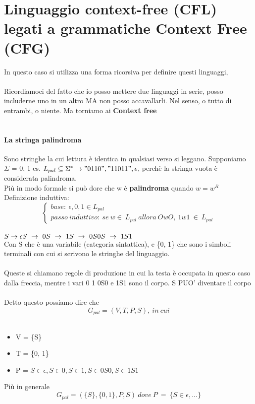 \documentclass[12pt, a4paper, openany, oneside]{book}
\begin{document}
\section{Linguaggio context-free (CFL) legati a grammatiche Context Free (CFG)}
In questo caso si utilizza una forma ricorsiva per definire questi linguaggi,
\\ \\
Ricordiamoci del fatto che io posso mettere due linguaggi in serie, posso 
includerne uno in un altro MA non posso accavallarli. Nel senso, o tutto di 
entrambi, o niente. Ma torniamo ai \textbf{Context free}
\\ \\
\paragraph{La stringa palindroma}
Sono stringhe la cui lettura è identica in qualsiasi verso si leggano. Supponiamo
$\Sigma$ = {0, 1} es. $L_{pal} \subseteq \Sigma ^{*} \to "0110", "11011", 
\epsilon$, perchè la stringa vuota è considerata palindroma. \\ 
Più in modo formale si può dore che w è \textbf{palindroma} quando $w = w^{R}$
Definizione induttiva:
\[
\begin{cases}
base:~\epsilon, 0, 1 \in L_{pal} \\
passo~induttivo:~ se ~w\in ~L_{pal} ~allora ~OwO, ~1w1 ~\in ~L_{pal}
\end{cases}
\]
\\
$
S \to \epsilon\\
S ~ \to ~ 0 \\
S ~ \to ~ 1 \\
S ~ \to ~ 0S0 \\
S ~ \to ~ 1S1$ \\
Con S che è una variabile (categoria sintattica), e \{0, 1\} che sono i simboli
terminali con cui si scrivono le stringhe del linguaggio.\\ \\
Queste si chiamano regole di produzione in cui la testa è occupata in questo
caso dalla freccia, mentre i vari 0 1 0S0 e 1S1 sono il corpo. S PUO' diventare
il corpo \\ \\ 
Detto questo possiamo dire che
$$G_{pal} = (V, T, P, S), ~in ~cui $$\\
\begin{itemize}
	\item V = \{S\}
	\item T = \{0, 1\}
	\item P = $S \in \epsilon, S \in 0, S \in 1, S \in 0S0, S \in 1S1$
\end{itemize}
Più in generale
$$G_{pal} = (\{S\},\{0, 1\}, P, S) ~  dove ~  P  ~ = ~  \{S \in \epsilon, ...\}$$
\end{document}
